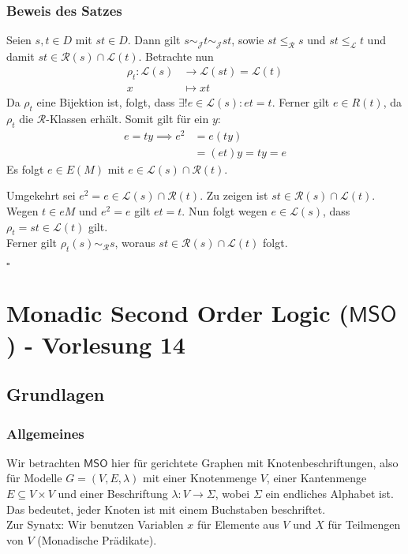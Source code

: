 \documentclass[12pt, german]{article}
\newcommand{\grer}{\sim_{\mathcal{R}}}
\newcommand{\grej}{\sim_{\mathcal{J}}}
\newcommand{\lgreleq}{\leqslant_{\mathcal{L}}}
\newcommand{\lgrereq}{\leqslant_{\mathcal{R}}}
\newcommand{\lcal}{\mathcal L}
\newcommand{\rcal}{\mathcal R}
\newcommand{\mso}{\mathsf{MSO}}
\newcommand{\bewiesen}{
	
	\begin{flushright}
		$\square$  \\
\end{flushright}}
\begin{document}
	\subsubsection{Beweis des Satzes}
	Seien $s,t \in D$ mit $st \in D$. Dann gilt $s \grej t \grej st$, sowie $st \lgrereq s$ und $st \lgreleq t $ und damit $ st \in \rcal(s) \cap \lcal(t)$.
	Betrachte nun 
	\begin{align*}
		\rho_t : \lcal(s) &\to \lcal(st) = \lcal(t) \\
		x &\mapsto xt
	\end{align*}
	Da $\rho_t $ eine Bijektion ist, folgt, dass $\exists! e \in \lcal(s): et = t$. Ferner gilt $e \in R(t)$, da $\rho_t$ die $\rcal$-Klassen erhält. Somit gilt für ein $y$: 
	\begin{align*}
		e = ty \implies e^2 &= e(ty)  \\
		&= (et)y =ty = e
	\end{align*}
	Es folgt $ e \in E(M)$ mit $e \in \lcal(s) \cap \rcal(t)$. 
	\newline
	
	Umgekehrt sei $e^2 = e \in \lcal(s) \cap \rcal(t)$. Zu zeigen ist $st \in \rcal(s) \cap \lcal(t)$. \\
	Wegen $ t \in eM$ und $e^2 = e$ gilt $et =t$.
	Nun folgt wegen $e \in \lcal(s)$, dass $\rho_t = st \in \lcal(t)$ gilt. \\ 
	Ferner gilt $\rho_t(s) \grer s$, woraus $st \in \rcal(s) \cap \lcal(t)$ folgt.
	\bewiesen
	
\section{Monadic Second Order Logic ($\mso$) - Vorlesung 14}
\label{sec:vl14}
\subsection{Grundlagen}
\subsubsection{Allgemeines}
Wir betrachten $\mso$ hier für gerichtete Graphen mit Knotenbeschriftungen, also für Modelle $G=(V, E ,\lambda)$ mit einer Knotenmenge $V$, einer Kantenmenge $E \subseteq V \times V$ und einer Beschriftung $\lambda : V \to \Sigma$, wobei $\Sigma$ ein endliches Alphabet ist.
Das bedeutet, jeder Knoten ist mit einem Buchstaben beschriftet.\\
Zur Synatx: Wir benutzen Variablen $x$ für Elemente aus $V$ und $X$ für Teilmengen von $V$ (Monadische Prädikate).
\end{document}

